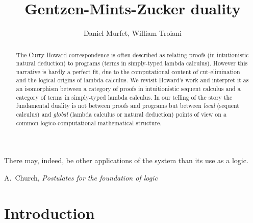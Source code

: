 \documentclass[english,letter paper,12pt,leqno]{article}
\theoremstyle{example}
\numberwithin{equation}{section}
\begin{document}
\def\ScoreOverhang{1pt}

\makeatletter
\DeclareRobustCommand{\rvdots}{%
  \vbox{
    \baselineskip4\p@\lineskiplimit\z@
    \kern-\p@
    \hbox{}\hbox{.}\hbox{.}\hbox{.}
  }}
\makeatother

\newcommand{\proofvdots}[1]{\overset{\displaystyle #1}{\rvdots}}
\def\Res{\res\!}
\newcommand{\ud}{\mathrm{d}}
\newcommand{\Ress}[1]{\res_{#1}\!}
\newcommand{\cat}[1]{\mathcal{#1}}
\newcommand{\lto}{\longrightarrow}
\newcommand{\xlto}[1]{\stackrel{#1}\lto}
\newcommand{\md}[1]{\mathscr{#1}}
\def\sus{\l}
\def\l{\,|\,}
\def\sgn{\textup{sgn}}
\def\samp{\zeta}
\def\Samp{Z}
\def\traff{N}
\newcommand{\bb}[1]{\mathbb{#1}}
\newcommand{\scr}[1]{\mathscr{#1}}

\title{Gentzen-Mints-Zucker duality}
\author{Daniel Murfet, William Troiani}

\maketitle

\begin{abstract}
The Curry-Howard correspondence is often described as relating proofs (in intutionistic natural deduction) to programs (terms in simply-typed lambda calculus). However this narrative is hardly a perfect fit, due to the computational content of cut-elimination and the logical origins of lambda calculus. We revisit Howard's work and interpret it as an isomorphism between a category of proofs in intuitionistic sequent calculus and a category of terms in simply-typed lambda calculus. In our telling of the story the fundamental duality is not between proofs and programs but between \emph{local} (sequent calculus) and \emph{global} (lambda calculus or natural deduction) points of view on a common logico-computational mathematical structure.

\end{abstract}

\tableofcontents

\setlength{\epigraphwidth}{0.85\textwidth}
\epigraph{There may, indeed, be other applications of the system than its use as a logic.}{A.~Church, \textsl{Postulates for the foundation of logic}}

\section{Introduction}
\end{document}
